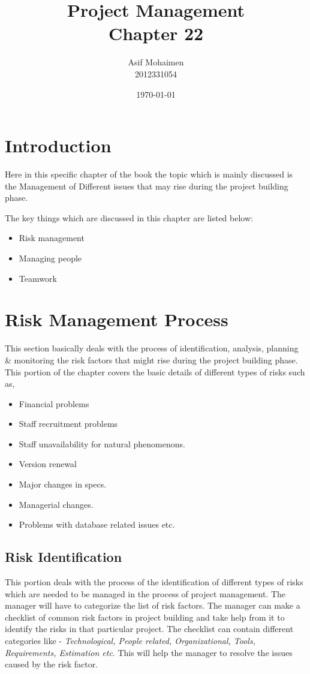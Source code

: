 \documentclass[dvips,12pt]{article}
\begin{document}
\title{
  Project Management\\
  Chapter 22
}
\author{
  Asif Mohaimen\\
  2012331054\\
}
\date{\today}

\maketitle


\section{Introduction} \label{introduction}
Here in this specific chapter of the book the topic which is mainly discussed is the Management of Different issues that may rise during the project building phase.

The key things which are discussed in this chapter are listed below:
\begin{itemize}
\item Risk management
\item Managing people
\item Teamwork
\end{itemize}

\section{Risk Management Process}
This section basically deals with the process of identification, analysis, planning \& monitoring the risk factors that might rise during the project building phase. This portion of the chapter covers the basic details of different types of risks such as,
\begin{itemize}
\item Financial problems
\item Staff recruitment problems
\item Staff unavailability for natural phenomenons.
\item Version renewal
\item Major changes in specs.
\item Managerial changes.
\item Problems with database related issues etc.
\end{itemize}

\subsection{Risk Identification}
This portion deals with the process of the identification of different types of risks which are needed to be managed in the process of project management. The manager will have to categorize the list of risk factors. The manager can make a checklist of common risk factors in project building and take help from it to identify the risks in that particular project. The checklist can contain different categories like - \textit{Technological, People related, Organizational, Tools, Requirements, Estimation etc}. This will help the manager to resolve the issues caused by the risk factor.
\end{document}
